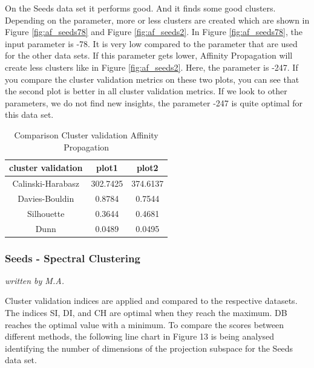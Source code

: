 On the Seeds data set it performs good. And it finds some good clusters. Depending on the parameter, more or less clusters are created which are shown in Figure \ref{fig:af_seeds78} and Figure \ref{fig:af_seeds2}. In Figure \ref{fig:af_seeds78}, the input parameter is -78. It is very low compared to the parameter that are used for the other data sets. If this parameter gets lower, Affinity Propagation will create less clusters like in Figure \ref{fig:af_seeds2}. Here, the parameter is -247. If you compare the cluster validation metrics on these two plots, you can see that the second plot is better in all cluster validation metrics. If we look to other parameters, we do not find new insights, the parameter -247 is quite optimal for this data set. 
\begin{table}[H]
	\centering
	\begin{tabular}{||c c c ||} 
		\hline
		cluster validation & plot1 & plot2 \\ [0.5ex] 
		\hline\hline
		Calinski-Harabasz & 302.7425	 &  374.6137  \\ 
		Davies-Bouldin & 0.8784	 & 0.7544	 \\
		Silhouette & 0.3644	 & 0.4681	 \\
		Dunn & 0.0489 & 0.0495  \\ [1ex] 
		\hline
	\end{tabular}
	\caption{Comparison Cluster validation Affinity Propagation}
	
\end{table}

\subsubsection{Seeds - Spectral Clustering}
\textit{written by M.A.}

Cluster validation indices are applied and compared to the respective datasets. The indices SI, DI, and CH are optimal when they reach the maximum. DB reaches the optimal value with a minimum. To compare the scores between different methods, the following line chart in Figure 13 is being analysed identifying the number of dimensions of the projection subspace for the Seeds data set. \newline

